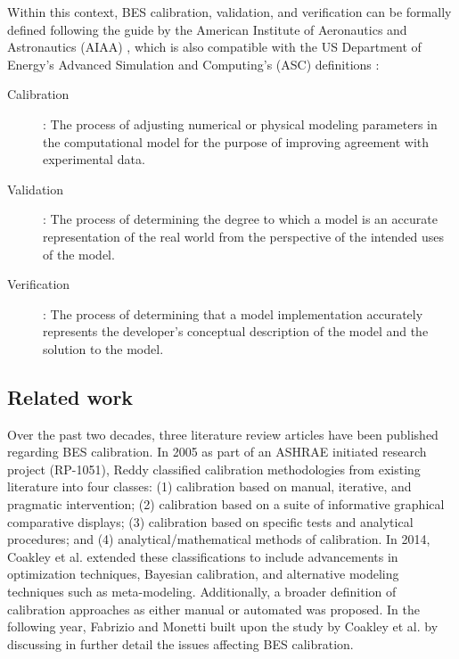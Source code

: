 \documentclass[review]{elsarticle}
\begin{document}
Within this context, BES calibration, validation, and verification can be formally defined following the guide by the American Institute of Aeronautics and Astronautics (AIAA) \cite{american1998aiaa}, which is also compatible with the US Department of Energy’s Advanced Simulation and Computing's (ASC) definitions \cite{trucano2006calibration}:

\begin{description}
    \item[Calibration]: The process of adjusting numerical or physical modeling parameters in the computational model for the purpose of improving agreement with experimental data.
    \item[Validation]: The process of determining the degree to which a model is an accurate representation of the real world from the perspective of the intended uses of the model. 
    \item[Verification]: The process of determining that a model implementation accurately represents the developer's conceptual description of the model and the solution to the model.
\end{description}

\subsection{Related work}
Over the past two decades, three literature review articles \cite{reddy2006literature, coakley2014review, fabrizio2015methodologies} have been published regarding BES calibration. In 2005 as part of an ASHRAE initiated research project (RP-1051), Reddy \cite{reddy2006literature} classified calibration methodologies from existing literature into four classes: (1) calibration based on manual, iterative, and pragmatic intervention; (2) calibration based on a suite of informative graphical comparative displays; (3) calibration based on specific tests and analytical procedures; and (4) analytical/mathematical methods of calibration. In 2014, Coakley et al. \cite{coakley2014review} extended these classifications to include advancements in optimization techniques, Bayesian calibration, and alternative modeling techniques such as meta-modeling. Additionally, a broader definition of calibration approaches as either manual or automated was proposed. In the following year, Fabrizio and Monetti \cite{fabrizio2015methodologies} built upon the study by Coakley et al. \cite{coakley2014review} by discussing in further detail the issues affecting BES calibration. 
\end{document}
